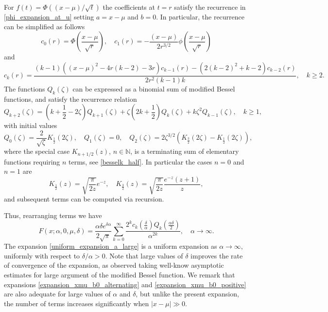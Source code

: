 \documentclass[10pt,a4paper,oneside]{article}
\numberwithin{equation}{section}
\begin{document}
For $f(t) = \Phi((x-\mu)/\sqrt{t})$ the coefficients at $t=r$ satisfy the recurrence in \eqref{phi_expansion_at_u} setting $a=x-\mu$ and $b=0$. In particular, the recurrence can be simplified as follows
\begin{equation}
c_0(r) = \Phi\left(\frac{x-\mu}{\sqrt{r}}\right), \quad c_1(r) = -\frac{(x-\mu)}{2 r^{3/2}} \phi\left(\frac{x-\mu}{\sqrt{r}}\right)
\end{equation}
and
\begin{equation}
c_k(r) = \frac{(k - 1) ((x-\mu)^2 - 4 r(k-2) - 3r) c_{k-1}(r) - (2(k-2)^2 + k-2) c_{k-2}(r)}{2r^2 (k-1) k}, \quad k\ge 2.
\end{equation}
The functions $Q_k(\zeta)$ can be expressed as a binomial sum of modified Bessel functions, and satisfy the recurrence relation \cite[\S 27.3.28]{Temme2015}
\begin{equation}
Q_{k+2}(\zeta) = \left(k + \frac{1}{2} -2\zeta\right) Q_{k+1}(\zeta) + \zeta\left(2k + \frac{1}{2}\right)Q_k(\zeta) + k\zeta^2 Q_{k-1}(\zeta), \quad k\ge 1,
\end{equation}
with initial values
\begin{equation}
Q_0(\zeta) = \frac{2}{\sqrt{\zeta}} K_{\frac{1}{2}}(2 \zeta), \quad Q_1(\zeta) = 0, \quad Q_2(\zeta) = 2 \zeta^{3/2} \left(K_{\frac{3}{2}}(2\zeta) - K_{\frac{1}{2}}(2 \zeta)\right),
\end{equation}
where the special case $K_{n+1/2}(z)$, $n \in \mathbb{N}$, is a terminating sum of elementary functions requiring $n$ terms, see \eqref{besselk_half}. In particular the cases $n=0$ and $n=1$ are
\begin{equation*}
K_{\frac{1}{2}}(z) = \sqrt{\frac{\pi}{2z}}e^{-z}, \quad K_{\frac{3}{2}}(z) = \sqrt{\frac{\pi}{2 z}}\frac{e^{-z} (z+1)}{z},
\end{equation*}
and subsequent terms can be computed via recursion.

Thus, rearranging terms we have
\begin{equation}\label{uniform_expansion_a_large}
F(x; \alpha, 0, \mu, \delta) = \frac{\alpha \delta e^{\delta \alpha}}{2 \sqrt{\pi}} \sum_{k=0}^{\infty} \frac{2^k c_k\left(\frac{\delta}{\alpha}\right) Q_k\left(\frac{\alpha \delta}{2}\right)}{\alpha^{2k}}, \quad \alpha \to \infty.
\end{equation}
The expansion \eqref{uniform_expansion_a_large} is a uniform expansion as $\alpha \to \infty$, uniformly with respect to $\delta / \alpha > 0$. Note that large values of $\delta$ improves the rate of convergence of the expansion, as observed taking well-know asymptotic estimates for large argument of the modified Bessel function. We remark that expansions \eqref{expansion_xmu_b0_alternating} and \eqref{expansion_xmu_b0_positive} are also adequate for large values of $\alpha$ and $\delta$, but unlike the present expansion, the number of terms increases significantly when $|x-\mu| \gg 0$.
\end{document}
